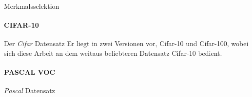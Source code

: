 Merkmalsselektion



\paragraph{CIFAR-10}
\label{cifar_10}

\cite{cifar_10}

Der \emph{\gls{Cifar}} Datensatz
Er liegt in zwei Versionen vor, \gls{Cifar}-10 und \gls{Cifar}-100, wobei sich diese Arbeit an dem weitaus beliebteren Datensatz \gls{Cifar}-10 bedient.

\begin{table}[t]
\centering
{}
\caption[Superpixelparameter für den \gls{Cifar}-10 Datensatz]{Wahl der Superpixelparameter für den \gls{Cifar}-10 Datensatz}
\label{tab:cifar_10}
\end{table}





\paragraph{PASCAL VOC}
\label{pascal_voc}

\emph{\gls{Pascal}} Datensatz
\cite{pascal_voc}

